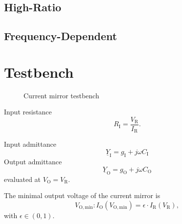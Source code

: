 \documentclass{article}[11pt]
\begin{document}
\subsection{High-Ratio}
\cite{galupmontoro-serparmosfet-94}
\cite[section 7.2.2]{erckert-aic-22}
\cite{fiorelli-serparmosfet-04}
\cite{arnaud-subnsota-06}

\subsection{Frequency-Dependent}
\cite{itakura-fdcm-96}

\section{Testbench}

\begin{figure}[H]
  \centering
  \begin{circuitikz}
    
  \end{circuitikz}
  \caption{Current mirror testbench}
  \label{fig:testbench}
\end{figure}

Input resistance
\begin{equation}
R_{\mathrm{I}} = \frac{V_{\mathrm{R}}}{I_{\mathrm{R}}}.
\end{equation}

Input admittance
\begin{equation}
\underline{Y}_{\mathrm{I}} = g_{\mathrm{I}} + j \omega C_{\mathrm{I}}
\end{equation}
Output admittance
\begin{equation}
\underline{Y}_{\mathrm{O}} = g_{\mathrm{O}} + j \omega C_{\mathrm{O}}
\end{equation}
evaluated at $V_{\mathrm{O}}=V_{\mathrm{R}}$.



The minimal output voltage of the current mirror is
\begin{equation}
V_{\mathrm{O,min}} : I_{\mathrm{O}}\left(V_{\mathrm{O,min}}\right) = \epsilon \cdot I_{\mathrm{R}}\left(V_{\mathrm{R}}\right),
\end{equation}
with $\epsilon \in (0,1)$.


\printbibliography
\end{document}
